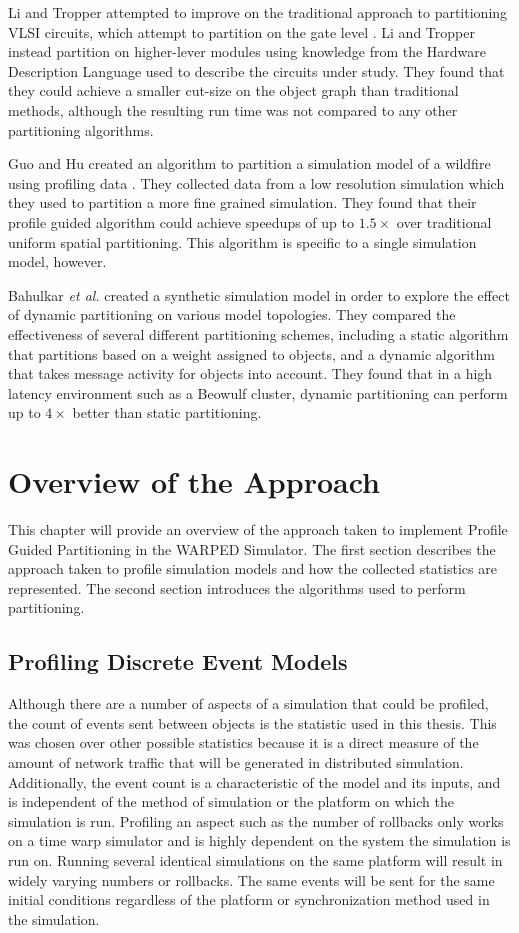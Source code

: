 \documentclass[11pt]{book}
\begin{document}
Li and Tropper attempted to improve on the traditional approach to partitioning VLSI circuits, which attempt to partition on the gate level \cite{lijun-09}. Li and Tropper instead partition on higher-lever modules using knowledge from the Hardware Description Language used to describe the circuits under study. They found that they could achieve a smaller cut-size on the object graph than traditional methods, although the resulting run time was not compared to any other partitioning algorithms. 

Guo and Hu created an algorithm to partition a simulation model of a wildfire using profiling data \cite{guo-11}. They collected data from a low resolution simulation which they used to partition a more fine grained simulation. They found that their profile guided algorithm could achieve speedups of up to \(1.5\times\) over traditional uniform spatial partitioning. This algorithm is specific to a single simulation model, however.

Bahulkar \emph{et al.} created a synthetic simulation model in order to explore the effect of dynamic partitioning on various model topologies. They compared the effectiveness of several different partitioning schemes, including a static algorithm that partitions based on a weight assigned to objects, and a dynamic algorithm that takes message activity for objects into account. They found that in a high latency environment such as a Beowulf cluster, dynamic partitioning can perform up to \(4\times\) better than static partitioning.


\chapter{Overview of the Approach}\label{overview}

This chapter will provide an overview of the approach taken to implement Profile Guided Partitioning in the WARPED Simulator. The first section describes the approach taken to profile simulation models and how the collected statistics are represented. The second section introduces the algorithms used to perform partitioning.

\section{Profiling Discrete Event Models}

Although there are a number of aspects of a simulation that could be profiled, the count of events sent between objects is the statistic used in this thesis. This was chosen over other possible statistics because it is a direct measure of the amount of network traffic that will be generated in distributed simulation. Additionally, the event count is a characteristic of the model and its inputs, and is independent of the method of simulation or the platform on which the simulation is run. Profiling an aspect such as the number of rollbacks only works on a time warp simulator and is highly dependent on the system the simulation is run on. Running several identical simulations on the same platform will result in widely varying numbers or rollbacks. The same events will be sent for the same initial conditions regardless of the platform or synchronization method used in the simulation.
\end{document}
